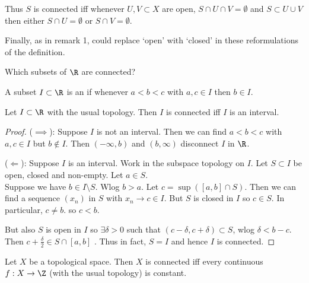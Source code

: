 \begin{remark}
\begin{enumerate}
        Thus $S$ is connected iff whenever $U,V\subset X$ are open, $S\cap U\cap V=\emptyset$ and $S \subset U \cup V$ then either $S\cap U=\emptyset$ or $S\cap V=\emptyset.$
        
        Finally, as in remark 1, could replace `open' with `closed' in these reformulations of the definition.
    \end{enumerate} 
\end{remark}

\begin{question}
Which subsets of $\R$ are connected?
\end{question}

\begin{definition}[Interval]
A subset $I\subset \R$ is an  if whenever $a<b<c$ with $a, c \in I$ then $b \in I$.
\end{definition}

\begin{proposition} \label{prp:41}      
Let $I\subset \R$ with the usual topology. Then $I$ is connected iff $I$ is an interval.
\end{proposition}

\begin{proof}
($\implies$): Suppose $I$ is not an interval. Then we can find $a<b<c$ with $a,c\in I$ but $b\not\in I$. Then $(-\infty,b)$ and $(b,\infty)$ disconnect $I$ in $\R$.

($\Longleftarrow$): Suppose $I$ is an interval. Work in the subspace topology on $I$. Let $S\subset I$ be open, closed and non-empty. Let $a\in S$. \\
Suppose we have $b\in I\setminus S$. Wlog $b>a$. Let $c=\sup([a,b]\cap S)$. Then we can find a sequence $(x_n)$ in $S$ with $x_n\to c\in I$. But $S$ is closed in $I$ so $c\in S$. In particular, $c\neq b$. so $c<b$.

But also $S$ is open in $I$ so $\exists \delta>0$ such that $(c-\delta, c+\delta)\subset S$, wlog $\delta < b-c$. Then $c +\frac{\delta}{2}\in S\cap [a,b]$ \Lightning. 
Thus in fact, $S=I$ and hence $I$ is connected.
\end{proof}

\begin{theorem} \label{thm:42}
Let $X$ be a topological space. Then $X$ is connected iff every continuous $f: X\to \Z$ (with the usual topology) is constant.
\end{theorem}

